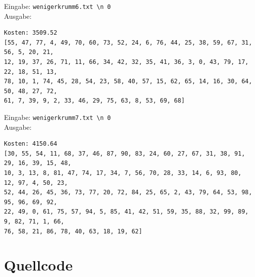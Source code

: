 \documentclass[a4paper,10pt,ngerman]{scrartcl}
\begin{document}
Eingabe: \lstinline|wenigerkrumm6.txt \n 0| \\ Ausgabe:
\begin{lstlisting}
Kosten: 3509.52
[55, 47, 77, 4, 49, 70, 60, 73, 52, 24, 6, 76, 44, 25, 38, 59, 67, 31, 56, 5, 20, 21,
12, 19, 37, 26, 71, 11, 66, 34, 42, 32, 35, 41, 36, 3, 0, 43, 79, 17, 22, 18, 51, 13, 
78, 10, 1, 74, 45, 28, 54, 23, 58, 40, 57, 15, 62, 65, 14, 16, 30, 64, 50, 48, 27, 72, 
61, 7, 39, 9, 2, 33, 46, 29, 75, 63, 8, 53, 69, 68]
\end{lstlisting}
Eingabe: \lstinline|wenigerkrumm7.txt \n 0| \\ Ausgabe:
\begin{lstlisting}
Kosten: 4150.64
[30, 55, 54, 11, 68, 37, 46, 87, 90, 83, 24, 60, 27, 67, 31, 38, 91, 29, 16, 39, 15, 48,
10, 3, 13, 8, 81, 47, 74, 17, 34, 7, 56, 70, 28, 33, 14, 6, 93, 80, 12, 97, 4, 50, 23, 
52, 44, 26, 45, 36, 73, 77, 20, 72, 84, 25, 65, 2, 43, 79, 64, 53, 98, 95, 96, 69, 92, 
22, 49, 0, 61, 75, 57, 94, 5, 85, 41, 42, 51, 59, 35, 88, 32, 99, 89, 9, 82, 71, 1, 66, 
76, 58, 21, 86, 78, 40, 63, 18, 19, 62]
\end{lstlisting}
\section{Quellcode}




\begingroup
\def\chapter*#1{}

\endgroup
\end{document}
